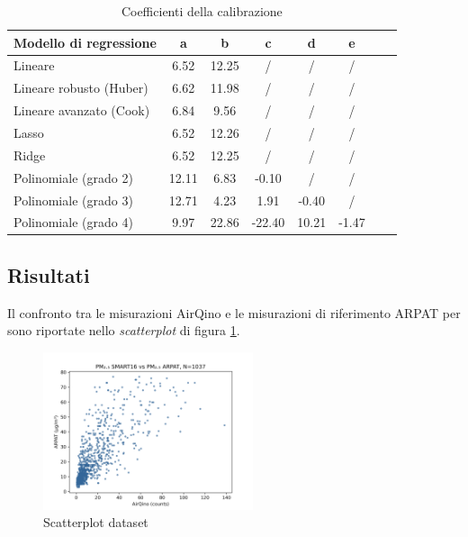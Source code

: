 \begin{table}[H]
    \footnotesize
    \centering
    \begin{tabular}{|l|c|c|c|c|c|c|c|}
    \hline
        \textbf{Modello di regressione} & \textbf{a} & \textbf{b} & \textbf{c} & \textbf{d} & \textbf{e} \\ \hline
        Lineare & 6.52 & 12.25 & / & / & / \\ \hline
        Lineare robusto (Huber) & 6.62 & 11.98 & / & / & / \\ \hline
        Lineare avanzato (Cook) & 6.84 & 9.56 & / & / & / \\ \hline
        Lasso & 6.52 & 12.26 & / & / & / \\ \hline
        Ridge & 6.52 & 12.25 & / & / & / \\ \hline
        Polinomiale (grado 2) & 12.11 & 6.83 & -0.10 & / & / \\ \hline
        Polinomiale (grado 3) & 12.71 & 4.23 & 1.91 & -0.40 & / \\ \hline
        Polinomiale (grado 4) & 9.97 & 22.86 & -22.40 & 10.21 & -1.47 \\ \hline
    \end{tabular}
    \caption{Coefficienti della calibrazione }
    \label{fig:risultati-no2-coefficienti}
\end{table}

\subsection{Risultati }\label{ssec:risultati-pm2.5}

Il confronto tra le misurazioni AirQino e le misurazioni di riferimento ARPAT per  sono riportate nello \textit{scatterplot} di figura \ref{fig:scatterplot_pm2.5}.

\begin{figure}[H]
\centering
\includegraphics[width=0.55\textwidth,height=\textheight,keepaspectratio]{img/sc_pm2.5.png}
\caption{Scatterplot dataset }
\label{fig:scatterplot_pm2.5}
\end{figure}

